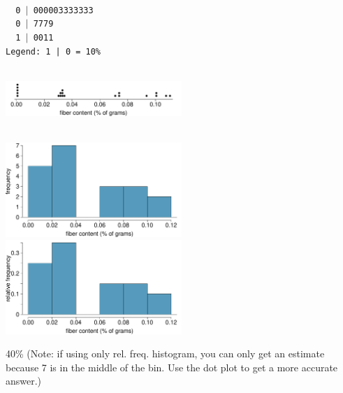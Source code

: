 \begin{parts}
\item \ \\
\texttt{~~0 $|$ 000003333333 \\
~~0 $|$ 7779 \\
~~1 $|$ 0011 \\
Legend: 1 | 0 = 10\%} \\
\item \ \\
\includegraphics[width = 0.5\textwidth]{figures/cereal_fiber_dot}
\item \ \\
\includegraphics[width = 0.5\textwidth]{figures/cereal_fiber_hist} \\
\includegraphics[width = 0.5\textwidth]{figures/cereal_fiber_relhist}
\item 40\% (Note: if using only rel. freq. histogram, you can only get an estimate because 7 is in the middle of the bin.  Use the dot plot to get a more accurate answer.)
\end{parts}
